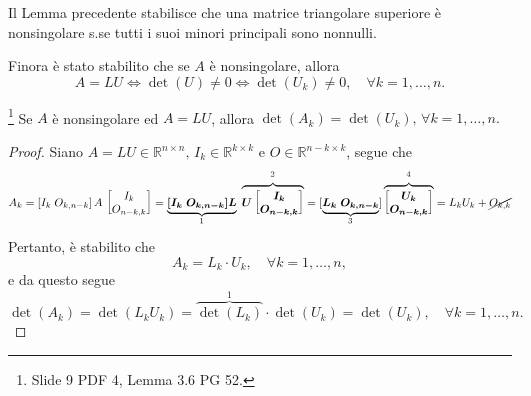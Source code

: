 Il Lemma precedente stabilisce che una matrice triangolare superiore è \gls{nonsingolare} s.se tutti i suoi minori principali sono nonnulli. 

Finora è stato stabilito che se $A$ è \gls{nonsingolare}, allora
\begin{equation}\label{eq:det(LU)neq0}
    A=LU \iff \det(U)\neq 0\iff \det(U_k)\neq 0,\quad \forall k=1,\hdots,n.
\end{equation}

\begin{lemma}
    \footnote{Slide 9 PDF 4, Lemma 3.6 PG 52.}
    Se $A$ è \gls{nonsingolare} ed $A=LU$, allora $\det(A_k)=\det(U_k),\, \forall k=1,\hdots, n.$
\end{lemma}
\begin{proof}
    Siano $A=LU\in\mathbb R^{n\times n},\, I_k\in\mathbb R^{k\times k}$ e $O\in\mathbb R^{n-k\times k}$, segue che
    \begin{equation}
        A_k=[I_k\; O_{k,n-k}]\, A\, \begin{bmatrix}
            I_k\\
            O_{n-k,k}
        \end{bmatrix}=
        \underbrace{\boldsymbol{[I_k\; O_{k,n-k}] L}}_{\footnotemark}\;\overbrace{\boldsymbol{U\begin{bmatrix}
            I_k\\
            O_{n-k,k}
        \end{bmatrix}}}^{\footnotemark} = [\underbrace{\boldsymbol{L_k\; O_{k,n-k}}}_{\footnotemark}]\overbrace{\boldsymbol{
        \begin{bmatrix}
            U_k\\
            O_{n-k,k}
        \end{bmatrix}}}^{\footnotemark} = L_kU_k+\cancel{O_{k,k}}
    \end{equation}
    Pertanto, è stabilito che
    \begin{equation*}
        A_k=L_k\cdot U_k,\quad \forall k=1,\hdots, n,
    \end{equation*}
    e da questo segue
    \begin{equation*}
        \det(A_k)=\det(L_k  U_k) = \overbrace{\det(L_k)}^1 \cdot\det(U_k) = \det(U_k),\quad \forall k=1,\hdots, n.
    \end{equation*}
\end{proof}

\addtocounter{footnote}{-3}

